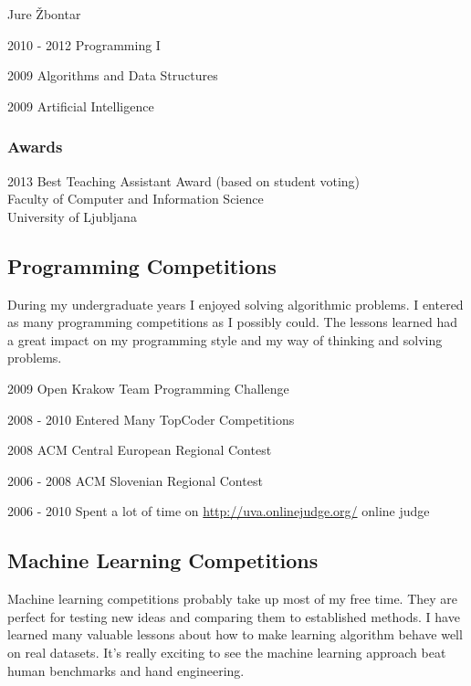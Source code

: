 \documentclass[12pt,a4paper]{article}
\begin{document}
\begin{cv}{Jure \v{Z}bontar}
\begin{cvlist}{}
\item[2010 - 2012] Programming I
\item[2009] Algorithms and Data Structures
\item[2009] Artificial Intelligence
\end{cvlist}

\subsubsection*{Awards}
\begin{cvlist}{}
\item[2013] Best Teaching Assistant Award (based on student voting) \\
Faculty of Computer and Information Science \\
University of Ljubljana 

\end{cvlist}

\subsection*{Programming Competitions}
During my undergraduate years I enjoyed solving algorithmic problems. I entered
as many programming competitions as I possibly could. The lessons learned
had a great impact on my programming style and my way of thinking and solving problems.

\begin{cvlist}{}
\item[2009] Open Krakow Team Programming Challenge
\item[2008 - 2010] Entered Many TopCoder Competitions
\item[2008] ACM Central European Regional Contest
\item[2006 - 2008] ACM Slovenian Regional Contest
\item[2006 - 2010] Spent a lot of time on \url{http://uva.onlinejudge.org/} online judge
\end{cvlist}

\subsection*{Machine Learning Competitions}
Machine learning competitions probably take up most of my free time.
They are perfect for testing new ideas and comparing them to established
methods. I have learned many valuable lessons about how to make learning
algorithm behave well on real datasets. It's really exciting to see the machine
learning approach beat human benchmarks and hand engineering.


\end{cv}
\end{document}
